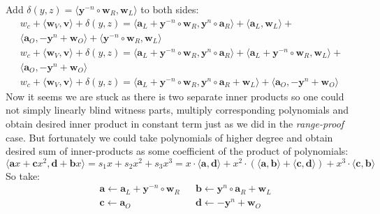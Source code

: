 \documentclass[../lecture-notes-148x210.tex]{subfiles}
\begin{document}
Add $\delta(y, z) = \langle \mathbf{y}^{-n} \circ \mathbf{w}_R, \mathbf{w}_L \rangle $ to both sides:
$$
\begin{aligned}
w_c + \langle \mathbf{w}_V, \mathbf{v} \rangle +
\delta(y, z) = \langle \mathbf{a}_L + \mathbf{y}^{-n} \circ \mathbf{w}_R, \mathbf{y}^n \circ \mathbf{a}_R \rangle + \langle \mathbf{a}_L, \mathbf{w}_L \rangle +\\
\langle \mathbf{a}_O, -\mathbf{y}^n + \mathbf{w}_O \rangle + 
\langle \mathbf{y}^{-n} \circ \mathbf{w}_R, \mathbf{w}_L \rangle\\
w_c + \langle \mathbf{w}_V, \mathbf{v} \rangle + \delta(y, z)
    = \langle \mathbf{a}_L + \mathbf{y}^{-n} \circ \mathbf{w}_R, 
    \mathbf{y}^n \circ \mathbf{a}_R \rangle + 
    \langle \mathbf{a}_L + \mathbf{y}^{-n} \circ \mathbf{w}_R,
    \mathbf{w}_L \rangle + \\
    \langle \mathbf{a}_O, 
    -\mathbf{y}^n + \mathbf{w}_O \rangle \\
    w_c + \langle \mathbf{w}_V, \mathbf{v} \rangle + \delta(y, z) =
\langle \mathbf{a}_L + \mathbf{y}^{-n} \circ \mathbf{w}_R, \mathbf{y}^n \circ \mathbf{a}_R + \mathbf{w}_L \rangle + \langle \mathbf{a}_O, -\mathbf{y}^n + \mathbf{w}_O \rangle
\end{aligned}
$$
Now it seems we are stuck as there is two separate inner products so one could not simply linearly blind witness parts, multiply corresponding polynomials and obtain desired inner product in constant term just as we did in the \textit{range-proof} case. But fortunately we could take polynomials of higher degree and obtain desired sum of inner-products as some coefficient of the product of polynomials:
\begin{equation}
    \langle \mathbf{a}x + \mathbf{c}x^2, \mathbf{d} + \mathbf{b}x \rangle = s_1x + s_2x^2 + s_3x^3 = x \cdot \langle \mathbf{a}, \mathbf{d} \rangle + x^2 \cdot (\langle \mathbf{a}, \mathbf{b} \rangle + \langle \mathbf{c}, \mathbf{d} \rangle) + x^3 \cdot \langle \mathbf{c}, \mathbf{b} \rangle
    \label{eq:inner-product-circuit-1}
\end{equation}
So take:
\begin{equation}
    \begin{aligned}
    &\mathbf{a} \gets \mathbf{a}_L + \mathbf{y}^{-n} \circ \mathbf{w}_R &&\mathbf{b} \gets \mathbf{y}^n \circ \mathbf{a}_R + \mathbf{w}_L \\
    &\mathbf{c} \gets \mathbf{a}_O &&\mathbf{d} \gets -\mathbf{y}^n + \mathbf{w}_O
    \end{aligned}
    \label{eq:inner-product-circuit-assignment}
\end{equation}
\end{document}
